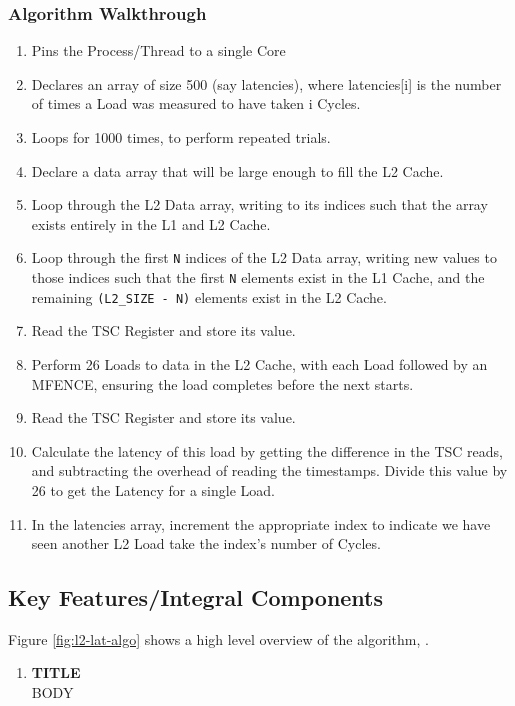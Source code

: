 \documentclass[bsc,frontabs,twoside,singlespacing,parskip,deptreport]{infthesis}     %
\begin{document}
\subsubsection{Algorithm Walkthrough}
\begin{enumerate}
    \item Pins the Process/Thread to a single Core
    \item Declares an array of size 500 (say latencies), where latencies[i] is the number of times a Load was measured to have taken i Cycles.
    \item Loops for 1000 times, to perform repeated trials.
    \item Declare a data array that will be large enough to fill the L2 Cache.
    \item Loop through the L2 Data array, writing to its indices such that the array exists entirely in the L1 and L2 Cache.
    \item Loop through the first \texttt{N} indices of the L2 Data array, writing new values to those indices such that the first \texttt{N} elements exist in the L1 Cache, and the remaining \texttt{(L2\_SIZE - N)} elements exist in the L2 Cache.
    \item Read the TSC Register and store its value.
    \item Perform 26 Loads to data in the L2 Cache, with each Load followed by an MFENCE\cite{mfence_spec}, ensuring the load completes before the next starts.
    \item Read the TSC Register and store its value.
    \item Calculate the latency of this load by getting the difference in the TSC reads, and subtracting the overhead of reading the timestamps. Divide this value by 26 to get the Latency for a single Load.
    \item In the latencies array, increment the appropriate index to indicate we have seen another L2 Load take the index's number of Cycles.
\end{enumerate}
\subsection{Key Features/Integral Components}\label{sec:l2_lat_key_comp}
Figure \ref{fig:l2-lat-algo} shows a high level overview of the algorithm, .
\begin{enumerate}
    \item{{\bf TITLE} \\
    BODY}
\end{enumerate}
\end{document}
